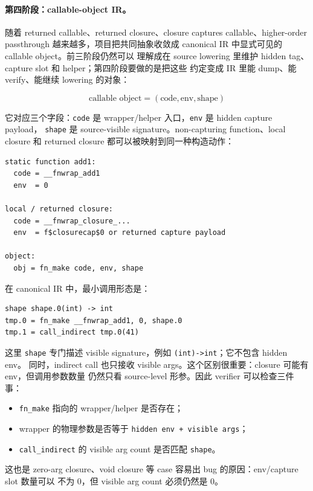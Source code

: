 \documentclass[UTF8,a4paper,11pt]{ctexart}
\begin{document}
\paragraph{第四阶段：callable-object IR。}
随着 returned callable、returned closure、closure captures callable、higher-order passthrough
越来越多，项目把共同抽象收敛成 canonical IR 中显式可见的 callable object。前三阶段仍然可以
理解成在 source lowering 里维护 hidden tag、capture slot 和 helper；第四阶段要做的是把这些
约定变成 IR 里能 dump、能 verify、能继续 lowering 的对象：

\[
\text{callable object} = (\text{code}, \text{env}, \text{shape})
\]

它对应三个字段：\texttt{code} 是 wrapper/helper 入口，\texttt{env} 是 hidden capture payload，
\texttt{shape} 是 source-visible signature。non-capturing function、local closure 和 returned
closure 都可以被映射到同一种构造动作：

\begin{lstlisting}[language={}]
static function add1:
  code = __fnwrap_add1
  env  = 0

local / returned closure:
  code = __fnwrap_closure_...
  env  = f$closurecap$0 or returned capture payload

object:
  obj = fn_make code, env, shape
\end{lstlisting}

在 canonical IR 中，最小调用形态是：

\begin{lstlisting}[language={}]
shape shape.0(int) -> int
tmp.0 = fn_make __fnwrap_add1, 0, shape.0
tmp.1 = call_indirect tmp.0(41)
\end{lstlisting}

这里 \texttt{shape} 专门描述 visible signature，例如 \texttt{(int)->int}；它不包含 hidden env。
同时，indirect call 也只接收 visible args。这个区别很重要：closure 可能有 env，但调用参数数量
仍然只看 source-level 形参。因此 verifier 可以检查三件事：

\begin{itemize}
  \item \texttt{fn\_make} 指向的 wrapper/helper 是否存在；
  \item wrapper 的物理参数是否等于 \texttt{hidden env + visible args}；
  \item \texttt{call\_indirect} 的 visible arg count 是否匹配 \texttt{shape}。
\end{itemize}

这也是 zero-arg closure、void closure 等 case 容易出 bug 的原因：env/capture slot 数量可以
不为 0，但 visible arg count 必须仍然是 0。
\end{document}
